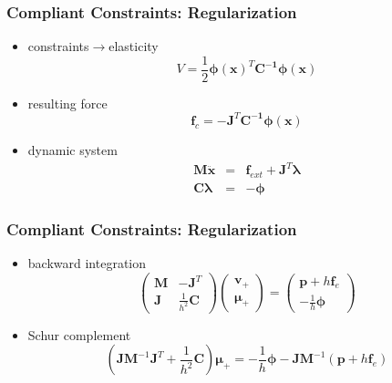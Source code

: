 \documentclass[serif,mathserif]{beamer}
\newcommand{\BOLD}[1]{\mathbf{#1}}
\begin{document}
\begin{frame}
 \frametitle{Compliant Constraints: Regularization}
 \begin{itemize}
  \item constraints$\rightarrow$elasticity
  \begin{equation*}
   V=\frac{1}{2}\BOLD{\phi(x)}^T\BOLD{C^{-1}\phi(x)}
  \end{equation*}
  \item resulting force
  \begin{equation*}
   \BOLD{f}_c = -\BOLD{J}^T\BOLD{C^{-1}\phi(x)}
  \end{equation*}
  \pause
  \pause
  \item dynamic system
  \begin{eqnarray*}
    \BOLD{M\ddot{x}} &=& \BOLD{f}_{ext}+\BOLD{J}^T\BOLD{\lambda} \\
    \BOLD{C\lambda} &=& -\BOLD{\phi}
  \end{eqnarray*}
 \end{itemize}
\end{frame}

\begin{frame}
 \frametitle{Compliant Constraints: Regularization}
 \begin{itemize}
  \item backward integration
    \begin{equation*}
     \begin{pmatrix}
      \BOLD{M} & -\BOLD{J}^T \\
      \BOLD{J} & \frac{1}{h^2}\BOLD{C}
     \end{pmatrix}
     \begin{pmatrix}
      \BOLD{v}_+ \\ \BOLD{\mu}_+
     \end{pmatrix}
     =
     \begin{pmatrix}
      \BOLD{p}+h\BOLD{f}_e \\ -\frac{1}{h}\BOLD{\phi}
     \end{pmatrix}
    \end{equation*}
  \item Schur complement
    \begin{equation*}
      (\BOLD{JM}^{-1}\BOLD{J}^T + \frac{1}{h^2}\BOLD{C})\BOLD{\mu}_+ = -\frac{1}{h}\BOLD{\phi}-\BOLD{JM}^{-1}(\BOLD{p}+h\BOLD{f}_e)
    \end{equation*}
 \end{itemize}

\end{frame}
\end{document}
